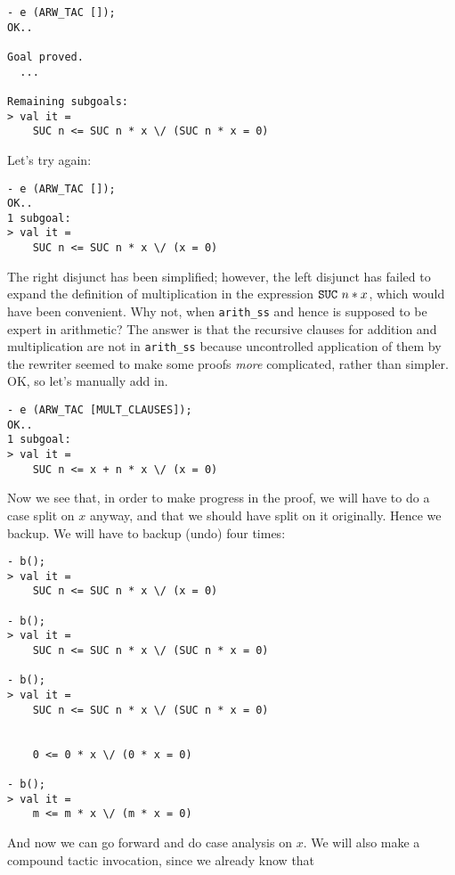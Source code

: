 \begin{session}\begin{verbatim}
- e (ARW_TAC []);
OK..

Goal proved.
  ...

Remaining subgoals:
> val it =
    SUC n <= SUC n * x \/ (SUC n * x = 0)
\end{verbatim}\end{session}
\noindent Let's try  again:
\begin{session}\begin{verbatim}
- e (ARW_TAC []);
OK..
1 subgoal:
> val it =
    SUC n <= SUC n * x \/ (x = 0)
\end{verbatim}\end{session}
The right disjunct has been simplified; however, the left disjunct has
failed to expand the definition of multiplication in the expression
$\mbox{\tt SUC}\ n * x$, which would have been convenient. Why not, when
\verb+arith_ss+ and hence  is supposed to be expert in
arithmetic? The answer is that the recursive clauses for addition and
multiplication are not in \verb+arith_ss+ because uncontrolled
application of them by the rewriter seemed to make some proofs {\it
more\/} complicated, rather than simpler. OK, so let's manually add
 in.
\begin{session}\begin{verbatim}
- e (ARW_TAC [MULT_CLAUSES]);
OK..
1 subgoal:
> val it =
    SUC n <= x + n * x \/ (x = 0)
\end{verbatim}\end{session}
Now we see that, in order to make progress in the proof, we will have to
do a case split on $x$ anyway, and that we should have split on it
originally. Hence we backup. We will have to backup (undo) four times:
\begin{session}\begin{verbatim}
- b();
> val it =
    SUC n <= SUC n * x \/ (x = 0)

- b();
> val it =
    SUC n <= SUC n * x \/ (SUC n * x = 0)

- b();
> val it =
    SUC n <= SUC n * x \/ (SUC n * x = 0)


    0 <= 0 * x \/ (0 * x = 0)

- b();
> val it =
    m <= m * x \/ (m * x = 0)
\end{verbatim}\end{session}
    And now we can go forward and do case analysis on $x$. We will
    also make a compound tactic invocation, since we already know that
